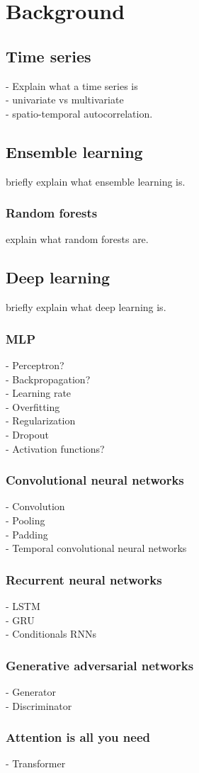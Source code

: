 \section{Background}

\subsection{Time series}
- Explain what a time series is\\
- univariate vs multivariate\\
- spatio-temporal autocorrelation.

\subsection{Ensemble learning}
briefly explain what ensemble learning is.

\subsubsection{Random forests}
explain what random forests are.



\subsection{Deep learning}
briefly explain what deep learning is.

\subsubsection{MLP}
- Perceptron?\\
- Backpropagation?\\
- Learning rate\\
- Overfitting\\
- Regularization\\
- Dropout\\
- Activation functions?

\subsubsection{Convolutional neural networks}
- Convolution\\
- Pooling\\
- Padding\\
- Temporal convolutional neural networks

\subsubsection{Recurrent neural networks}
- LSTM\\
- GRU\\
- Conditionals RNNs

\subsubsection{Generative adversarial networks}
- Generator\\
- Discriminator


\subsubsection{Attention is all you need}
- Transformer

